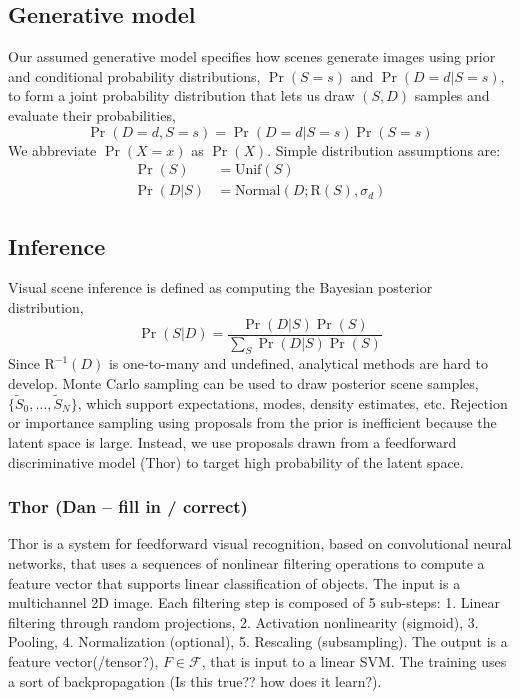 \documentclass[]{report}
\begin{document}
\subsection*{Generative model}
Our assumed generative model specifies how scenes generate images
using prior and conditional probability distributions, $\Pr(S=s)$ and
$\Pr(D=d | S=s)$, to form a joint probability distribution that lets
us draw $(S,D)$ samples and evaluate their probabilities,
\[
\Pr(D=d,S=s) = \Pr(D=d | S=s)\Pr(S=s)
\]
We abbreviate $\Pr(X=x)$ as $\Pr(X)$.  Simple distribution assumptions
are:
\begin{align*}
  \Pr(S) &= \mathrm{Unif}(S)\\
  \Pr(D | S) &= \mathrm{Normal}(D; \mathrm{R}(S), \sigma_d)
\end{align*}

\subsection*{Inference}
Visual scene inference is defined as computing the Bayesian posterior
distribution,
\[
\Pr(S | D) = \frac{\Pr(D | S)\Pr(S)}{\sum_S \Pr(D | S)\Pr(S)}
\]
Since $\mathrm{R}^{-1}(D)$ is one-to-many and undefined, analytical
methods are hard to develop.  Monte Carlo sampling can be used to draw
posterior scene samples, $\{\tilde{S}_0,\dots,\tilde{S}_N\}$, which
support expectations, modes, density estimates, etc. Rejection or
importance sampling using proposals from the prior is inefficient
because the latent space is large. Instead, we use proposals drawn
from a feedforward discriminative model (Thor) to target high
probability of the latent space.

\subsubsection*{Thor (Dan -- fill in / correct)}
Thor is a system for feedforward visual recognition, based on
convolutional neural networks, that uses a sequences of nonlinear
filtering operations to compute a feature vector that supports linear
classification of objects. The input is a multichannel 2D image. Each
filtering step is composed of 5 sub-steps: 1. Linear filtering through
random projections, 2. Activation nonlinearity (sigmoid), 3. Pooling,
4. Normalization (optional), 5. Rescaling (subsampling). The output is
a feature vector(/tensor?), $F \in \mathcal{F}$, that is input to a
linear SVM. The training uses a sort of backpropagation (Is this
true?? how does it learn?).
\end{document}

